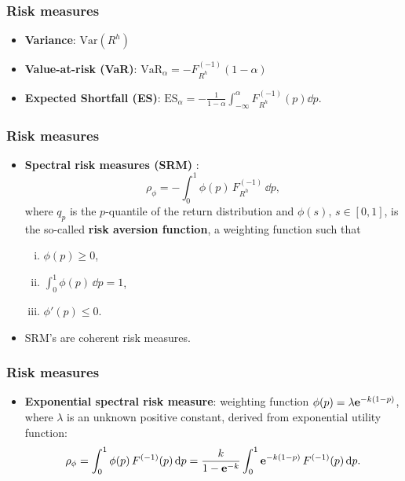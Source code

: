 \documentclass[10pt,mathserif,notes=show]{beamer}
\renewcommand{\(}{\begin{columns}}
\renewcommand{\)}{\end{columns}}
\newcommand{\<}[1]{\begin{column}{#1}}
\renewcommand{\>}{\end{column}}
\theoremstyle{definition}
\begin{document}
\begin{frame}
  \frametitle{Risk measures}
  \begin{itemize}
    \addtolength{\itemsep}{5pt}
  \item {\bf Variance}: $\text{Var}(R^h)$
  \item {\bf Value-at-risk (VaR)}: $\text{VaR}_\alpha = -
    F_{R^h}^{(-1)}(1-\alpha)$  
  \item {\bf Expected Shortfall (ES)}: 
    $\displaystyle \text{ES}_\alpha =-
    \frac{1}{1-\alpha}\int_{-\infty}^{\alpha} F_{R^h}^{(-1)}(p) \dd p$.
  \end{itemize}
\end{frame}

\begin{frame}
  \frametitle{Risk measures}
  \begin{itemize}
    \addtolength{\itemsep}{3pt}
\item {\bf Spectral risk measures (SRM)} \citep{Acerbi2002,Cotter2006}:
    \begin{equation*}
      \rho_\phi = -\int_0^1 \phi(p)\, F_{R^h}^{(-1)}\, \dd p,
    \end{equation*}
    where $q_p$ is the $p$-quantile of the return distribution and
    $\phi(s)$, $s\in [0,1]$, is the so-called {\bf risk aversion
      function\/}, a weighting function such that 

    \hspace*{2cm}\begin{minipage}[t]{.7\linewidth}
      \vspace*{-.75\baselineskip}
      \begin{enumerate}[(i)]
        \addtolength{\itemsep}{3pt}
      \item $\phi(p)\geq 0$,
      \item $\int_0^1\phi(p)\, \dd p=1$,
      \item $\phi'(p)\leq 0$.
      \end{enumerate}
    \end{minipage}
  \item SRM's are coherent risk measures.
  \end{itemize}
\end{frame}

\begin{frame}
  \frametitle{Risk measures}
  \begin{itemize}
    \addtolength{\itemsep}{3pt}
  \item {\bf Exponential spectral risk measure}:
    weighting function $\phi(p) = \lambda {\bf e}^{-k(1-p)}$, where
    $\lambda$ is an unknown positive constant, derived from exponential
  utility function: 
  \begin{equation*}
    \rho_{\phi} = \int_0^1 \phi(p)\, F^{(-1)}(p)\, {\rm d} p =
    \frac{k}{1-{\bf e}^{-k}} \int_0^1 {\bf e}^{-k(1-p)}\, F^{(-1)}(p)\, {\rm d} p. 
  \end{equation*}
\end{itemize}
\end{frame}
\end{document}
